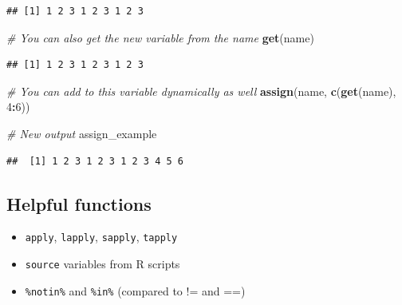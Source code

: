 \documentclass[
]{book}
\newenvironment{Shaded}{\begin{snugshade}}{\end{snugshade}}
\newcommand{\CommentTok}[1]{\textcolor[rgb]{0.56,0.35,0.01}{\textit{#1}}}
\newcommand{\DecValTok}[1]{\textcolor[rgb]{0.00,0.00,0.81}{#1}}
\newcommand{\KeywordTok}[1]{\textcolor[rgb]{0.13,0.29,0.53}{\textbf{#1}}}
\newcommand{\NormalTok}[1]{#1}
\newcommand{\OperatorTok}[1]{\textcolor[rgb]{0.81,0.36,0.00}{\textbf{#1}}}
\providecommand{\tightlist}{%
  \setlength{\itemsep}{0pt}\setlength{\parskip}{0pt}}
\begin{document}
\begin{verbatim}
## [1] 1 2 3 1 2 3 1 2 3
\end{verbatim}

\begin{Shaded}
\begin{Highlighting}[]
\CommentTok{# You can also get the new variable from the name}
\KeywordTok{get}\NormalTok{(name)}
\end{Highlighting}
\end{Shaded}

\begin{verbatim}
## [1] 1 2 3 1 2 3 1 2 3
\end{verbatim}

\begin{Shaded}
\begin{Highlighting}[]
\CommentTok{# You can add to this variable dynamically as well}
\KeywordTok{assign}\NormalTok{(name, }\KeywordTok{c}\NormalTok{(}\KeywordTok{get}\NormalTok{(name), }\DecValTok{4}\OperatorTok{:}\DecValTok{6}\NormalTok{))}

\CommentTok{# New output}
\NormalTok{assign_example}
\end{Highlighting}
\end{Shaded}

\begin{verbatim}
##  [1] 1 2 3 1 2 3 1 2 3 4 5 6
\end{verbatim}

\hypertarget{helpful-functions}{%
\subsection{Helpful functions}\label{helpful-functions}}

\begin{itemize}
\tightlist
\item
  \texttt{apply}, \texttt{lapply}, \texttt{sapply}, \texttt{tapply}
\item
  \texttt{source} variables from R scripts
\item
  \texttt{\%notin\%} and \texttt{\%in\%} (compared to != and ==)
\end{itemize}
\end{document}
